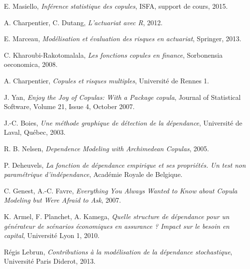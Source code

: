 \begin{thebibliography}{ABC}	


 E. Masiello, \emph{Inférence statistique des copules}, ISFA, support de cours, 2015.

 A. Charpentier, C. Dutang, \emph{L'actuariat avec R}, 2012.

 E. Marceau, \emph{Modélisation et évaluation des risques en actuariat}, Springer, 2013.

 C. Kharoubi-Rakotomalala, \emph{Les fonctions copules en finance}, Sorbonensia oeconomica, 2008.

 A. Charpentier, \emph{Copules et risques multiples}, Université de Rennes 1.

 J. Yan, \emph{Enjoy the Joy of Copulas: With a Package copula}, Journal of Statistical Software, Volume 21, Issue 4, October 2007.

 J.-C. Boies, \emph{Une méthode graphique de détection de la dépendance}, Université de Laval,
Québec, 2003.

 R. B. Nelsen, \emph{Dependence Modeling with Archimedean Copulas}, 2005.

 P. Deheuvels, \emph{La fonction de dépendance empirique et ses propriétés. Un test non paramétrique d'indépendance}, Académie Royale de Belgique.

 C. Genest, A.-C. Favre, \emph{Everything You Always Wanted to Know about Copula Modeling but Were Afraid to Ask}, 2007.

 K. Armel, F. Planchet, A. Kamega, \emph{Quelle structure de dépendance pour un générateur de scénarios économiques en assurance ? Impact sur le besoin en capital}, Université Lyon 1, 2010.

 Régis Lebrun, \emph{Contributions à la modélisation
de la dépendance stochastique}, Université Paris Diderot, 2013. 







\end{thebibliography}


